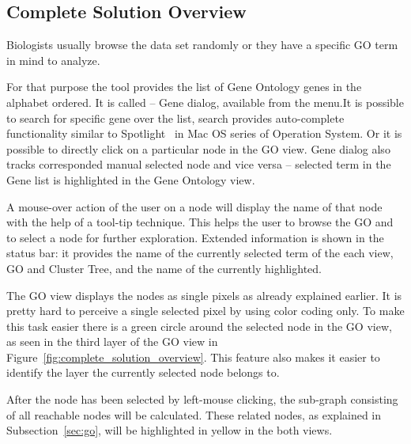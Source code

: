 




\subsection{Complete Solution Overview}
\label{sec:complete_solution_overview}

Biologists usually browse the data set randomly or they have a specific GO term in mind to analyze.


For that purpose the tool provides the list of Gene Ontology genes in the alphabet ordered. It is called -- Gene dialog, available from the menu.It is possible to search for specific gene over the list, search provides auto-complete functionality similar to Spotlight~\cite{Spotlight} in Mac OS series of Operation System. Or it is possible to directly click on a particular node in the GO view. Gene dialog also tracks corresponded manual selected node and vice versa -- selected term in the Gene list is highlighted in the Gene Ontology view.


A mouse-over action of the user on a node will display the name of that node with the help of a tool-tip technique. This helps the user to browse the GO and to select a node for further exploration. Extended information is shown in the status bar: it provides the name of the currently selected term of the each view, GO and Cluster Tree, and the name of the currently highlighted.


The GO view displays the nodes as single pixels as already explained earlier. It is pretty hard to perceive a single selected pixel by using color coding only. To make this task easier there is a green circle around the selected node in the GO view, as seen in the third layer of the GO view in Figure~\ref{fig:complete_solution_overview}. This feature also makes it easier to identify the layer the currently selected node belongs to.


After the node has been selected by left-mouse clicking, the sub-graph consisting of all reachable nodes will be calculated. These related nodes, as explained in Subsection~\ref{sec:go}, will be highlighted in yellow in the both views.


